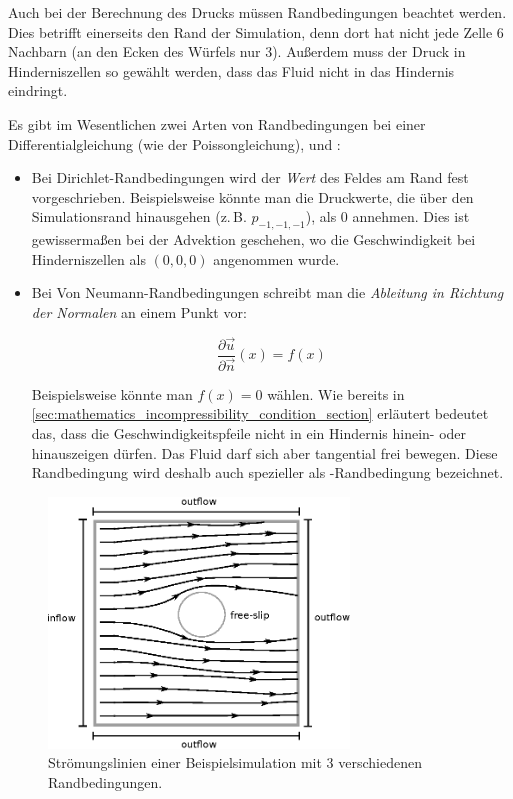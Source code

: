 Auch bei der Berechnung des Drucks müssen Randbedingungen beachtet werden. Dies
betrifft einerseits den Rand der Simulation, denn dort hat nicht jede Zelle 6
Nachbarn (an den Ecken des Würfels nur 3). Außerdem muss der Druck in
Hinderniszellen so gewählt werden, dass das Fluid nicht in das Hindernis
eindringt.

Es gibt im Wesentlichen zwei Arten von Randbedingungen bei einer
Differentialgleichung (wie der Poissongleichung),
 und
:

\begin{itemize}
\item
	Bei Dirichlet-Randbedingungen wird der \emph{Wert} des Feldes am Rand
	fest vorgeschrieben. Beispielsweise könnte man die Druckwerte, die über
	den Simulationsrand hinausgehen (z.\,B. $p_{-1,-1,-1}$), als $0$ annehmen.
	Dies ist gewissermaßen bei der Advektion geschehen, wo die
	Geschwindigkeit bei Hinderniszellen als $(0,0,0)$ angenommen wurde.
\item
	Bei Von Neumann-Randbedingungen schreibt man die \emph{Ableitung in
	Richtung der Normalen} an einem Punkt vor:

	\begin{equation}
	\frac{
		\partial \vec{u}
	}
	{
		\partial \vec{n}
	}(x)
	=
	f(x)
	\end{equation}

	Beispielsweise könnte man $f(x)=0$ wählen. Wie bereits in
	\autoref{sec:mathematics_incompressibility_condition_section} erläutert
	bedeutet das, dass die Geschwindigkeitspfeile nicht in ein Hindernis
	hinein- oder hinauszeigen dürfen. Das Fluid darf sich aber tangential
	frei bewegen. Diese Randbedingung wird deshalb auch spezieller als
	-Randbedingung bezeichnet.
\end{itemize}

\begin{figure}[ht]
\centering
\includegraphics[width=8cm]{images/boundary_types}
\caption{Strömungslinien einer Beispielsimulation mit 3 verschiedenen Randbedingungen.}
\label{fig:stam_boundary_types}
\end{figure}

